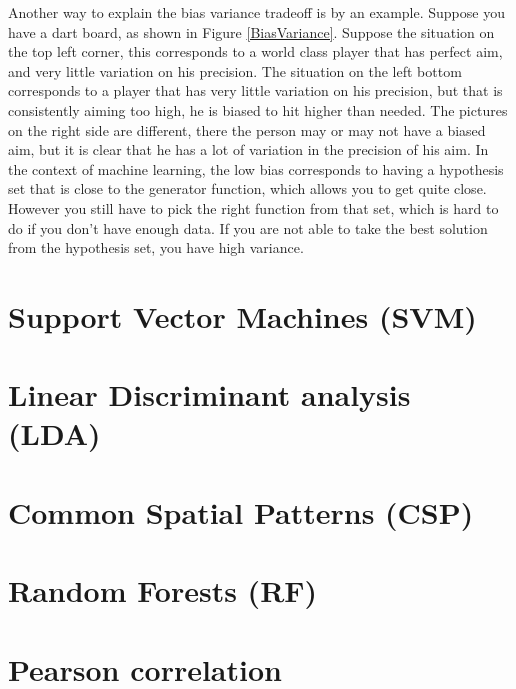 
Another way to explain the bias variance tradeoff is by an example. Suppose you have a dart board, as shown in Figure \ref{BiasVariance}. Suppose the situation on the top left corner, this corresponds to a world class player that has perfect aim, and very little variation on his precision. The situation on the left bottom corresponds to a player that has very little variation on his precision, but that is consistently aiming too high, he is biased to hit higher than needed. The pictures on the right side are different, there the person may or may not have a biased aim, but it is clear that he has a lot of variation in the precision of his aim.
\npar
In the context of machine learning, the low bias corresponds to having a hypothesis set that is close to the generator function, which allows you to get quite close. However you still have to pick the right function from that set, which is hard to do if you don't have enough data. If you are not able to take the best solution from the hypothesis set, you have high variance.



\section{Support Vector Machines (SVM)}


\section{Linear Discriminant analysis (LDA)}


\section{Common Spatial Patterns (CSP)}


\section{Random Forests (RF)}

\section{Pearson correlation}
